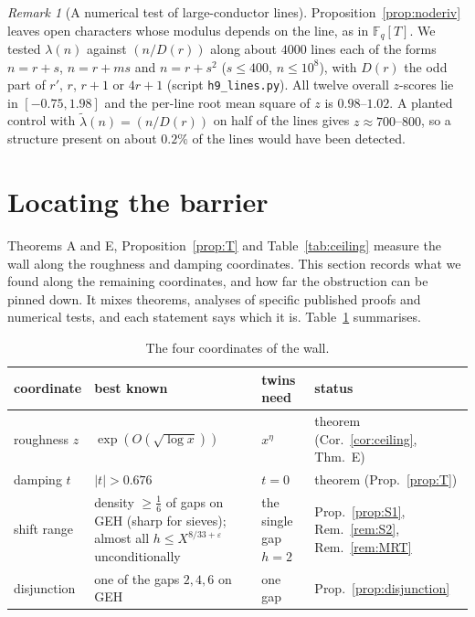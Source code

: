 \documentclass[11pt]{amsart}
\theoremstyle{definition}
\theoremstyle{remark}
\newtheorem{remark}[theorem]{Remark}
\begin{document}
\begin{remark}[A numerical test of large-conductor lines]\label{rem:H9}
Proposition~\ref{prop:noderiv} leaves open characters whose modulus depends on the line, as in $\mathbb F_q[T]$. We tested $\lambda(n)$ against $(n/D(r))$ along about $4000$ lines each of the forms $n=r+s$, $n=r+ms$ and $n=r+s^2$ ($s\le400$, $n\le10^8$), with $D(r)$ the odd part of $r'$, $r$, $r+1$ or $4r+1$ (script \texttt{h9\_lines.py}). All twelve overall $z$-scores lie in $[-0.75,1.98]$ and the per-line root mean square of $z$ is $0.98$--$1.02$. A planted control with $\tilde\lambda(n)=(n/D(r))$ on half of the lines gives $z\approx700$--$800$, so a structure present on about $0.2\%$ of the lines would have been detected.
\end{remark}

\section{Locating the barrier}\label{sec:locate}
Theorems A and E, Proposition~\ref{prop:T} and Table~\ref{tab:ceiling} measure the wall along the roughness and damping coordinates. This section records what we found along the remaining coordinates, and how far the obstruction can be pinned down. It mixes theorems, analyses of specific published proofs and numerical tests, and each statement says which it is. Table~\ref{tab:coords} summarises.

\begin{table}[h]
\centering
\small
\begin{tabular}{p{2.2cm}p{5.0cm}p{2.2cm}p{3.3cm}}
\toprule
coordinate & best known & twins need & status\\
\midrule
roughness $z$ & $\exp(O(\sqrt{\log x}))$ & $x^\eta$ & theorem (Cor.~\ref{cor:ceiling}, Thm.~E)\\
damping $t$ & $|t|>0.676$ & $t=0$ & theorem (Prop.~\ref{prop:T})\\
shift range & density $\ge\frac16$ of gaps on GEH (sharp for sieves); almost all $h\le X^{8/33+\varepsilon}$ unconditionally & the single gap $h=2$ & Prop.~\ref{prop:S1}, Rem.~\ref{rem:S2}, Rem.~\ref{rem:MRT}\\
disjunction & one of the gaps $2,4,6$ on GEH & one gap & Prop.~\ref{prop:disjunction}\\
\bottomrule
\end{tabular}
\caption{The four coordinates of the wall.}
\label{tab:coords}
\end{table}
\end{document}
